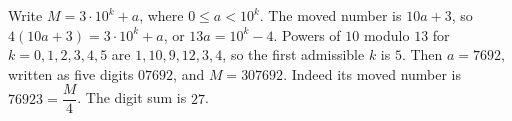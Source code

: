 Write $M=3\cdot10^k+a$, where $0\le a<10^k$. The moved number is $10a+3$, so $4(10a+3)=3\cdot10^k+a$, or $13a=10^k-4$. Powers of $10$ modulo $13$ for $k=0,1,2,3,4,5$ are $1,10,9,12,3,4$, so the first admissible $k$ is $5$. Then $a=7692$, written as five digits $07692$, and $M=307692$. Indeed its moved number is $76923=\dfrac{M}{4}$. The digit sum is $\boxed{27}$.
